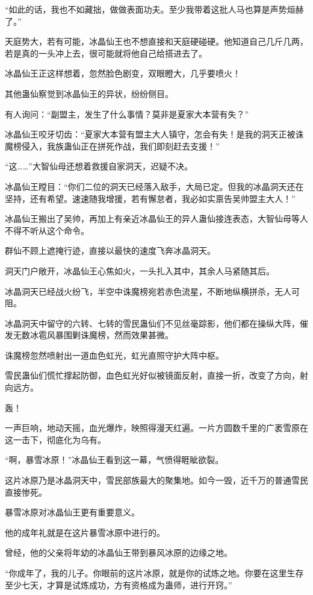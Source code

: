\begin{this_body}
“如此的话，我也不如藏拙，做做表面功夫。至少我带着这批人马也算是声势烜赫了。”

天庭势大，若有可能，冰晶仙王也不想直接和天庭硬碰硬。他知道自己几斤几两，若是真的一头冲上去，很可能就将他自己给搭进去了。

冰晶仙王正这样想着，忽然脸色剧变，双眼瞪大，几乎要喷火！

其他蛊仙察觉到冰晶仙王的异状，纷纷侧目。

有人询问：“副盟主，发生了什么事情？莫非是夏家大本营有失？”

冰晶仙王咬牙切齿：“夏家大本营有盟主大人镇守，怎会有失！是我的洞天正被诛魔榜侵入，我族蛊仙正在拼死作战，我们即刻赶去支援！”

“这……”大智仙母还想着救援自家洞天，迟疑不决。

冰晶仙王瞠目：“你们二位的洞天已经落入敌手，大局已定。但我的冰晶洞天还在坚持，还有希望。速速随我增援，若有懈怠者，我必如实禀告吴帅盟主大人！”

冰晶仙王搬出了吴帅，再加上有亲近冰晶仙王的异人蛊仙接连表态，大智仙母等人不得不听从这个命令。

群仙不顾上遮掩行迹，直接以最快的速度飞奔冰晶洞天。

洞天门户敞开，冰晶仙王心焦如火，一头扎入其中，其余人马紧随其后。

冰晶洞天已经战火纷飞，半空中诛魔榜宛若赤色流星，不断地纵横拼杀，无人可阻。

冰晶洞天中留守的六转、七转的雪民蛊仙们不见丝毫踪影，他们都在操纵大阵，催发无数冰雹风暴围剿诛魔榜，然而效果甚微。

诛魔榜忽然喷射出一道血色虹光，虹光直照守护大阵中枢。

雪民蛊仙们慌忙撑起防御，血色虹光好似被镜面反射，直接一折，改变了方向，射向远方。

轰！

一声巨响，地动天摇，血光爆炸，映照得漫天红遍。一片方圆数千里的广袤雪原在这一击下，彻底化为乌有。

“啊，暴雪冰原！”冰晶仙王看到这一幕，气愤得睚眦欲裂。

这片冰原乃是冰晶洞天中，雪民部族最大的聚集地。如今一毁，近千万的普通雪民直接惨死。

暴雪冰原对冰晶仙王更有重要意义。

他的成年礼就是在这片暴雪冰原中进行的。

曾经，他的父亲将年幼的冰晶仙王带到暴风冰原的边缘之地。

“你成年了，我的儿子。你眼前的这片冰原，就是你的试炼之地。你要在这里生存至少七天，才算是试炼成功，方有资格成为蛊师，进行开窍。”


\end{this_body}
